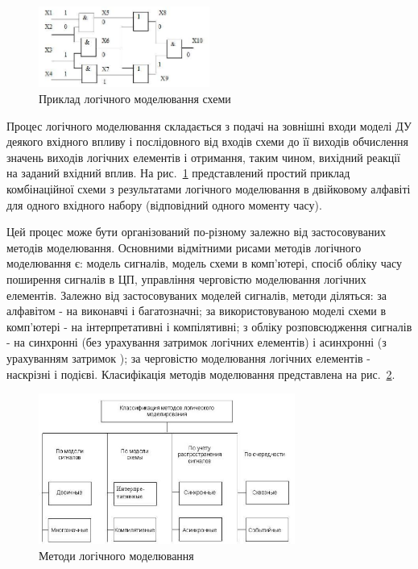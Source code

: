 \documentclass[12pt,a4paper]{article}
\begin{document}
\begin{figure}[h]
  \centering
    \includegraphics[width=0.5\textwidth]{03_02.jpg}
  \caption{Приклад логічного моделювання схеми\label{logicModEx}}
\end{figure}



Процес логічного моделювання складається з подачі на зовнішні входи моделі ДУ деякого вхідного впливу і послідовного від входів схеми до її виходів обчислення значень виходів логічних елементів і отримання, таким чином, вихідний реакції на заданий вхідний вплив. На рис.~\ref{logicModEx} представлений простий приклад комбінаційної схеми з результатами логічного моделювання в двійковому алфавіті для одного вхідного набору (відповідний одного моменту часу).

Цей процес може бути організований по-різному залежно від застосовуваних методів моделювання. Основними відмітними рисами методів логічного моделювання є: модель сигналів, модель схеми в комп'ютері, спосіб обліку часу поширення сигналів в ЦП, управління черговістю моделювання логічних елементів. Залежно від застосовуваних моделей сигналів, методи діляться: за алфавітом - на виконавчі і багатозначні; за використовуваною моделі схеми в комп'ютері - на інтерпретативні і компілятивні; з обліку розповсюдження сигналів - на синхронні (без урахування затримок логічних елементів) і асинхронні (з урахуванням затримок ); за черговістю моделювання логічних елементів - наскрізні і подієві. Класифікація методів моделювання представлена ​​на рис.~\ref{logicModMethods}.

\begin{figure}[h]
  \centering
    \includegraphics[width=0.75\textwidth]{03_03.jpg}
  \caption{Методи логічного моделювання\label{logicModMethods}}
\end{figure}
\end{document}
